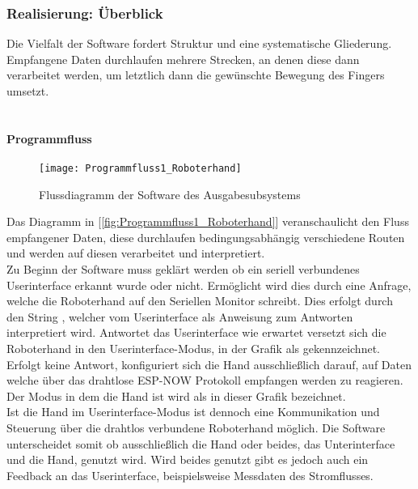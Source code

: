 \documentclass[titlepage,12pt,twoside]{article}
\begin{document}
\subsubsection{Realisierung: Überblick}
Die Vielfalt der Software fordert Struktur und eine systematische Gliederung. Empfangene Daten durchlaufen mehrere Strecken, an denen diese dann 
verarbeitet werden, um letztlich dann die gewünschte Bewegung des Fingers umsetzt. \\
\\

\paragraph{Programmfluss}
\hfill \break
\hfill \break
\begin{figure}[H]
	\begin{center}
		\scalebox{1.1}
		{\texttt{[image: Programmfluss1\_Roboterhand]}}
		\caption{Flussdiagramm der Software des Ausgabesubsystems}
		\label{fig:Programmfluss1_Roboterhand}		
	\end{center}
\end{figure}
\hfill \break
Das Diagramm in [\textcolor{blue}{\autoref{fig:Programmfluss1_Roboterhand}}] veranschaulicht den Fluss empfangener Daten, diese durchlaufen bedingungsabhängig verschiedene Routen und 
werden auf diesen verarbeitet und interpretiert.
\\
Zu Beginn der Software muss geklärt werden ob ein seriell verbundenes Userinterface erkannt wurde oder nicht. Ermöglicht wird dies durch eine Anfrage, 
welche die Roboterhand auf den Seriellen Monitor schreibt. Dies erfolgt durch den String , welcher vom Userinterface als Anweisung zum Antworten 
interpretiert wird. Antwortet das Userinterface wie erwartet versetzt sich die Roboterhand in den Userinterface-Modus, in der Grafik als  
gekennzeichnet. Erfolgt keine Antwort, konfiguriert sich die Hand ausschließlich darauf, auf Daten welche über das drahtlose ESP-NOW Protokoll empfangen 
werden zu reagieren. Der Modus in dem die Hand ist wird als  in dieser Grafik bezeichnet. \\
Ist die Hand im Userinterface-Modus ist dennoch eine Kommunikation und Steuerung über die drahtlos verbundene Roboterhand möglich. Die Software 
unterscheidet somit ob ausschließlich die Hand oder beides, das Unterinterface und die Hand, genutzt wird. Wird beides genutzt gibt es jedoch auch ein 
Feedback an das Userinterface, beispielsweise Messdaten des Stromflusses. \\
\end{document}
